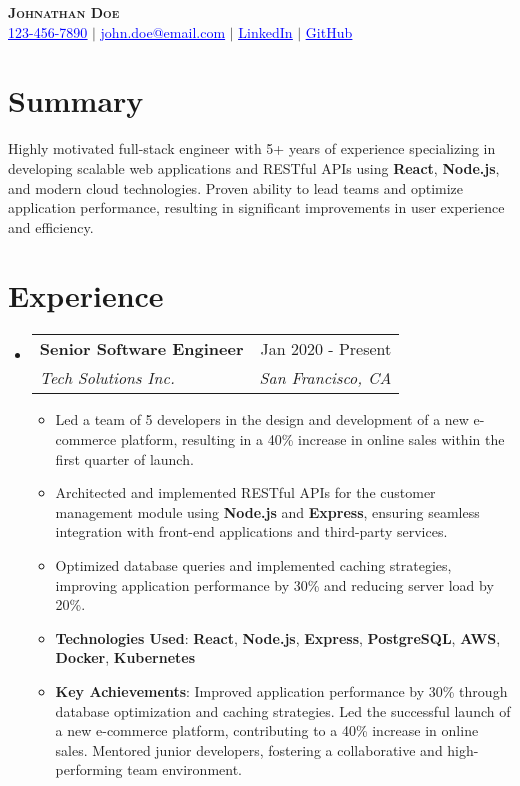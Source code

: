 \documentclass[letterpaper,11pt]{article}
\makeatletter
\newcommand{\resumeItem}[1]{
  \item\small{
    {#1 \vspace{-2pt}}
  }
}
\newcommand{\resumeSubheading}[4]{
  \vspace{-2pt}\item
    \begin{tabular*}{0.97\textwidth}[t]{l@{\extracolsep{\fill}}r}
      \textbf{#1} & #2 \\
      \textit{\small#3} & \textit{\small #4} \\
    \end{tabular*}\vspace{-7pt}
}
\newcommand{\resumeSubHeadingListStart}{\begin{itemize}[leftmargin=0.15in, label={}]}
\newcommand{\resumeSubHeadingListEnd}{\end{itemize}}
\newcommand{\resumeItemListStart}{\begin{itemize}}
\newcommand{\resumeItemListEnd}{\end{itemize}\vspace{-5pt}}
\makeatother
\begin{document}

\begin{center}
    \textbf{\Huge \scshape Johnathan Doe} \\ \vspace{1pt}
    \small \href{tel:123-456-7890}{\textcolor{blue}{\underline{123-456-7890}}} $|$ \href{mailto:john.doe@email.com}{\textcolor{blue}{\underline{john.doe@email.com}}} $|$ 
    \href{https://linkedin.com/in/johndoe}{\textcolor{blue}{\underline{LinkedIn}}} $|$ 
    \href{https://github.com/johndoe}{\textcolor{blue}{\underline{GitHub}}}
\end{center}

\section{Summary}
\small{Highly motivated full-stack engineer with 5+ years of experience specializing in developing scalable web applications and RESTful APIs using \textbf{React}, \textbf{Node.js}, and modern cloud technologies. Proven ability to lead teams and optimize application performance, resulting in significant improvements in user experience and efficiency.}

\section{Experience}
\resumeSubHeadingListStart
    \resumeSubheading
      {Senior Software Engineer}{Jan 2020 - Present}
      {Tech Solutions Inc.}{San Francisco, CA}
      \resumeItemListStart
        \resumeItem{Led a team of 5 developers in the design and development of a new e-commerce platform, resulting in a 40\% increase in online sales within the first quarter of launch.}
        \resumeItem{Architected and implemented RESTful APIs for the customer management module using \textbf{Node.js} and \textbf{Express}, ensuring seamless integration with front-end applications and third-party services.}
        \resumeItem{Optimized database queries and implemented caching strategies, improving application performance by 30\% and reducing server load by 20\%.}
        \resumeItem{\textbf{Technologies Used}: \textbf{React}, \textbf{Node.js}, \textbf{Express}, \textbf{PostgreSQL}, \textbf{AWS}, \textbf{Docker}, \textbf{Kubernetes}}
        \resumeItem{\textbf{Key Achievements}: Improved application performance by 30\% through database optimization and caching strategies. Led the successful launch of a new e-commerce platform, contributing to a 40\% increase in online sales. Mentored junior developers, fostering a collaborative and high-performing team environment.}
      \resumeItemListEnd
\resumeSubHeadingListEnd
\end{document}
